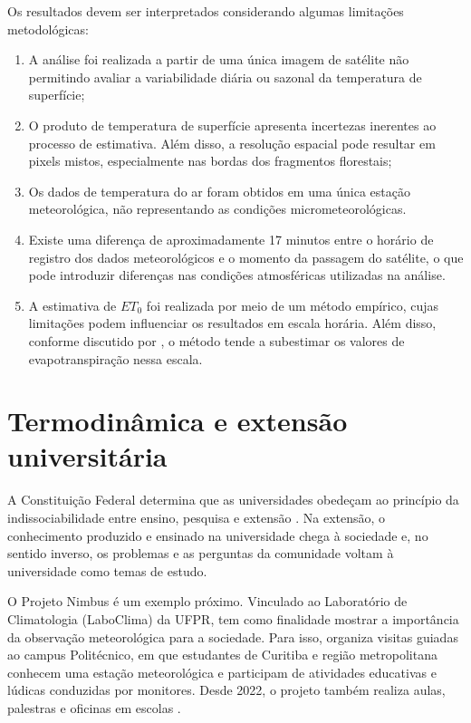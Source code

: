 \documentclass[
12pt,			%
openany,		%
oneside,		%
a4paper,		%
sumario=tradicional,
chapter=TITLE,
section=TITLE,
subsection=Title,
brazil,			%
]{abntex2}
\begin{document}
	Os resultados devem ser interpretados considerando algumas limitações metodológicas:
	
	\begin{enumerate}
		\item A análise foi realizada a partir de uma única imagem de satélite não permitindo avaliar a variabilidade diária ou sazonal da temperatura de superfície;
		
		\item O produto de temperatura de superfície apresenta incertezas inerentes ao processo de estimativa. Além disso, a resolução espacial pode resultar em pixels mistos, especialmente nas bordas dos fragmentos florestais;
		
		\item Os dados de temperatura do ar foram obtidos em uma única estação meteorológica, não representando as condições micrometeorológicas.
		
		\item Existe uma diferença de aproximadamente 17 minutos entre o horário de registro dos dados meteorológicos e o momento da passagem do satélite, o que pode introduzir diferenças nas condições atmosféricas utilizadas na análise.
		
		\item A estimativa de $ET_0$ foi realizada por meio de um método empírico, cujas limitações podem influenciar os resultados em escala horária. Além disso, conforme discutido por , o método tende a subestimar os valores de evapotranspiração nessa escala.
	\end{enumerate}
	
	\chapter{Termodinâmica e extensão universitária}
	\label{cap:extensao}
	
	A Constituição Federal determina que as universidades obedeçam ao princípio da indissociabilidade entre ensino, pesquisa e extensão \cite{cf1988}. Na extensão, o conhecimento produzido e ensinado na universidade chega à sociedade e, no sentido inverso, os problemas e as perguntas da comunidade voltam à universidade como temas de estudo.
	
	O Projeto Nimbus é um exemplo próximo. Vinculado ao Laboratório de Climatologia (LaboClima) da UFPR, tem como finalidade mostrar a importância da observação meteorológica para a sociedade. Para isso, organiza visitas guiadas ao campus Politécnico, em que estudantes de Curitiba e região metropolitana conhecem uma estação meteorológica e participam de atividades educativas e lúdicas conduzidas por monitores. Desde 2022, o projeto também realiza aulas, palestras e oficinas em escolas \cite{nimbus}.
	
\end{document}
